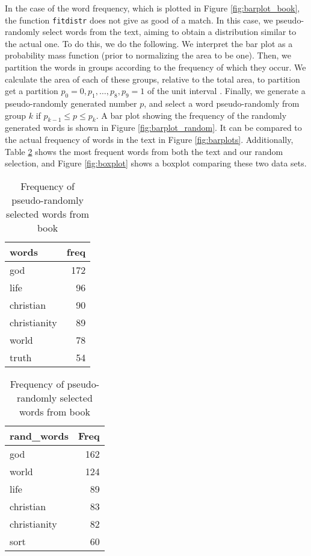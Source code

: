 \documentclass[letterpaper, 10 pt, conference]{article}
\begin{document}
In the case of the word frequency, which is plotted in Figure \ref{fig:barplot_book}, the function \texttt{fitdistr} does not give as good of a match. In this case, we pseudo-randomly select words from the text, aiming to obtain a distribution similar to the actual one. To do this, we do the following. We interpret the bar plot as a probability mass function (prior to normalizing the area to be one). Then, we partition the words in groups according to the frequency of which they occur. We calculate the area of each of these groups, relative to the total area, to partition get a partition $p_0 = 0, p_1, \dots, p_8, p_9 = 1$ of the unit interval . Finally, we generate a pseudo-randomly generated number $p$, and select a word pseudo-randomly from group $k$ if $p_{k-1} \leq p \leq p_k$. A bar plot showing the frequency of the randomly generated words is shown in Figure \ref{fig:barplot_random}. It can be compared to the actual frequency of words in the text in Figure \ref{fig:barplots}. Additionally, Table \ref{tab:wordfreq} shows the most frequent words from both the text and our random selection, and Figure \ref{fig:boxplot} shows a boxplot comparing these two data sets.

\begin{table}[t]
	\caption{Word frequency }
	\begin{subtable}{0.45\textwidth}
		\centering
		\caption{Frequency of words in the book}
	\begin{tabular}{lr}
		\hline
		words & freq \\ 
		\hline
		god & 172 \\ 
		life &  96 \\ 
		christian &  90 \\ 
		christianity &  89 \\ 
		world &  78 \\ 
		truth &  54 \\ 
		\hline
	\end{tabular}
	\label{tab:barplot_words}
	\end{subtable}
	\hfill
	\begin{subtable}{0.45\textwidth}
		\centering
		\caption{Frequency of pseudo-randomly selected words from book}
		\begin{tabular}{lr}
			\hline
			rand\_words & Freq \\ 
			\hline
			god & 162 \\ 
			world & 124 \\ 
			life &  89 \\ 
			christian &  83 \\ 
			christianity &  82 \\ 
			sort &  60 \\ 
			\hline
		\end{tabular}
		\label{tab:barplot_rand_words}
	\end{subtable}
	\label{tab:wordfreq}
\end{table}
\end{document}
